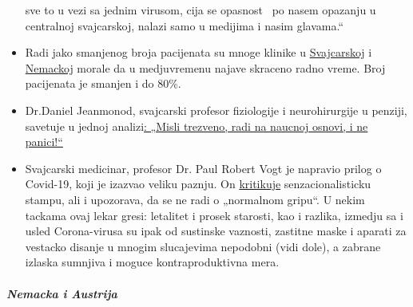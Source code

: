 \begin{itemize}
  sve to u vezi sa jednim virusom, cija se opasnost ~po nasem opazanju u
  centralnoj svajcarskoj, nalazi samo u medijima i nasim glavama.``
\item
  Radi jako smanjenog broja pacijenata su mnoge klinike u
  \href{https://www.20min.ch/schweiz/news/story/Spitaeler-28949526}{Svajcarskoj}
  i
  \href{https://www.spiegel.de/wirtschaft/unternehmen/trotz-corona-pandemie-warum-kliniken-jetzt-kurzarbeit-anmelden-a-3dc61bc9-fb12-4298-8022-bb4c2be39d7d}{Nemackoj}
  morale da u medjuvremenu najave skraceno radno vreme. Broj pacijenata
  je smanjen i do 80\%.
\item
  Dr.Daniel Jeanmonod, svajcarski profesor fiziologije i neurohirurgije
  u penziji, savetuje u jednoj
  analizi\href{https://off-guardian.org/2020/04/07/think-deep-do-good-science-and-do-not-panic/}{:
  „Misli trezveno, radi na naucnoj osnovi, i ne panici!``}
\item
  Svajcarski medicinar, profesor Dr. Paul Robert Vogt je napravio prilog
  o Covid-19, koji je izazvao veliku paznju. On
  \href{https://www.mittellaendische.ch/2020/04/07/covid-19-eine-zwischenbilanz-oder-eine-analyse-der-moral-der-medizinischen-fakten-sowie-der-aktuellen-und-zukünftigen-politischen-entscheidungen/}{kritikuje}
  senzacionalisticku stampu, ali i upozorava, da se ne radi o „normalnom
  gripu``. U nekim tackama ovaj lekar gresi: letalitet i prosek
  starosti, kao i razlika, izmedju sa i usled Corona-virusa su ipak od
  sustinske vaznosti, zastitne maske i aparati za vestacko disanje u
  mnogim slucajevima nepodobni (vidi dole), a zabrane izlaska sumnjiva i
  moguce kontraproduktivna mera.
\end{itemize}

\hypertarget{nemacka-i-austrija}{%
\subparagraph{\texorpdfstring{\textbf{Nemacka i
Austrija}}{Nemacka i Austrija}}\label{nemacka-i-austrija}}

